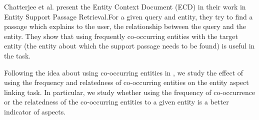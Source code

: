 Chatterjee et al. \cite{chatterjee2019why} present the Entity Context Document (ECD) in their work in Entity Support Passage Retrieval.For a given query and entity, they try to find a passage which explains to the user, the relationship between the query and the entity. They show that using frequently co-occurring entities with the target entity (the entity about which the support passage needs to be found) is useful in the task.

Following the idea about using co-occurring entities in \cite{dalton2014entity, chatterjee2019why}, we study the effect of using the frequency and relatedness of co-occurring entities on the entity aspect linking task. In particular, we study whether using the frequency of co-occurrence or the relatedness of the co-occurring entities to a given entity is a better indicator of aspects.

